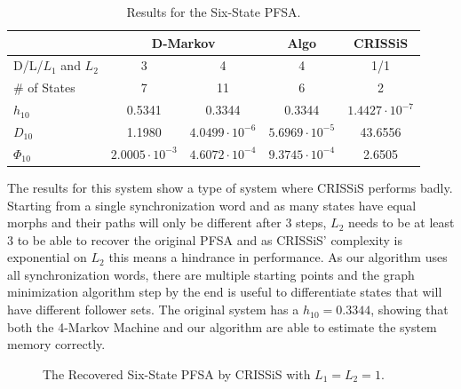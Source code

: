 {\begin{table}
\centering
\caption{Results for the Six-State PFSA. \label{tab:sixstate}}
\begin{tabular}{|l|c|c|c|c|}
\hline
 & \multicolumn{2}{c|}{\textbf{D-Markov}} & \textbf{Algo} & \textbf{CRISSiS}\\
 \hline
D/L/$L_1$ and $L_2$ & 3 & 4 & 4 & 1/1\\
\hline
\# of States & 7 & 11 & 6 & 2 \\ 
$h_{10}$ & 0.5341 & 0.3344 & 0.3344 & $1.4427\cdot 10^{-7}$ \\
$D_{10}$ & 1.1980 & $4.0499\cdot 10^{-6}$ & $5.6969\cdot10^{-5}$ &  43.6556\\
$\Phi_{10}$ & $2.0005\cdot 10^{-3}$ & $4.6072\cdot 10^{-4}$ & $9.3745\cdot10^{-4}$ & 2.6505\\
 \hline
\end{tabular}
\end{table}

The results for this system show a type of system where CRISSiS performs badly. Starting from a single synchronization word and as many states have equal morphs and their paths will only be different after 3 steps, $L_2$ needs to be at least 3 to be able to recover the original PFSA and as CRISSiS' complexity is exponential on $L_2$ this means a hindrance in performance. As our algorithm uses all synchronization words, there are multiple starting points and the graph minimization algorithm step by the end is useful to differentiate states that will have different follower sets. The original system has a $h_{10} = 0.3344$, showing that both the 4-Markov Machine and our algorithm are able to estimate the system memory correctly.

\begin{figure}
\centering
{}
\caption{The Recovered Six-State PFSA by CRISSiS with $L_1 = L_2 = 1$.\label{fig:sixstatecrissis}}
\end{figure}

}
